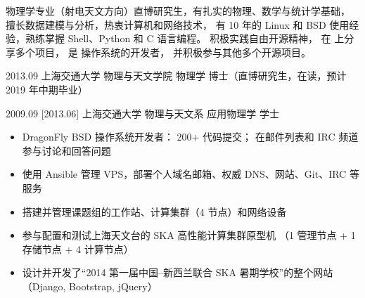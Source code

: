\documentclass[zh]{resume}
\begin{document}
\makeheader

{\onehalfspacing\hspace{2em}%
物理学专业（射电天文方向）直博研究生，有扎实的物理、数学与统计学基础，
擅长数据建模与分析，热衷计算机和网络技术，
有 10 年的 Linux 和 BSD 使用经验，熟练掌握 Shell、Python 和 C 语言编程。
积极实践自由开源精神，
在  上分享多个项目，
是  操作系统的开发者，
并积极参与其他多个开源项目。
\par}

\begin{competences}
\end{competences}

\begin{educations}
  \education%
    {2013.09}%
    {上海交通大学}%
    {物理与天文学院}%
    {物理学}%
    {博士（直博研究生，在读，预计 2019 年中期毕业）}

  \separator{0.5ex}
  \education%
    {2009.09}%
    [2013.06]%
    {上海交通大学}%
    {物理与天文系}%
    {应用物理学}%
    {学士}
\end{educations}

\begin{itemize}
  \item DragonFly BSD 操作系统开发者：
    200+ 代码提交；
    在邮件列表和 IRC 频道参与讨论和回答问题
  \item 使用 Ansible 管理 VPS，部署个人域名邮箱、权威 DNS、网站、Git、IRC 等服务
  \item 搭建并管理课题组的工作站、计算集群（4 节点）和网络设备
  \item 参与配置和测试上海天文台的 SKA 高性能计算集群原型机
    （1 管理节点 + 1 存储节点 + 4 计算节点）
  \item 设计并开发了\enquote{2014 第一届中国--新西兰联合 SKA 暑期学校}的整个网站
    （Django, Bootstrap, jQuery）
\end{itemize}
\end{document}

